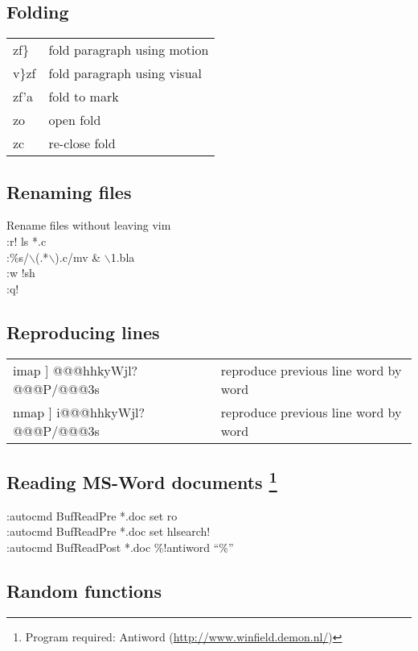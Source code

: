 \documentclass[10pt]{article}
\begin{document}
\subsection*{Folding}
\begin{center}
\begin{longtable}{l|l}
 zf\} & fold paragraph using motion\\ 
 v\}zf & fold paragraph using visual\\ 
 zf'a & fold to mark\\ 
 zo & open fold\\ 
 zc & re-close fold
\end{longtable}
\end{center} 

\subsection*{Renaming files}
 Rename files without leaving vim\\
 :r! ls *.c\\ 
 :\%s/$\backslash$(.*$\backslash$).c/mv \& $\backslash$1.bla\\ 
 :w !sh\\ 
 :q!

\subsection*{Reproducing lines}
\begin{center}
\begin{longtable}{l|l}
 imap ] @@@hhkyWjl?@@@P/@@@3s & reproduce previous line word by word\\ 
 nmap ] i@@@hhkyWjl?@@@P/@@@3s & reproduce previous line word by word
\end{longtable}
\end{center} 

\subsection*{Reading MS-Word documents \footnote{Program required: Antiword (\url{http://www.winfield.demon.nl/})}}
 :autocmd BufReadPre *.doc set ro\\ 
 :autocmd BufReadPre *.doc set hlsearch!\\ 
 :autocmd BufReadPost *.doc \%!antiword ``\%''

\subsection*{Random functions}
\end{document}
